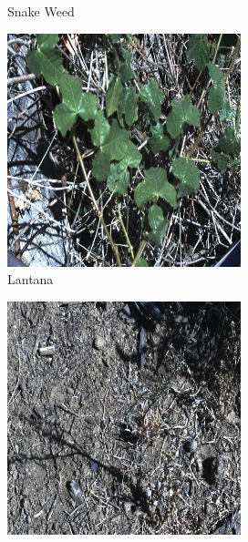 \begin{figure}[h]
\begin{subfigure}{0.24\textwidth}
        \caption{Snake Weed}
    \end{subfigure}
    \hfill
    \begin{subfigure}{0.24\textwidth}
        \includegraphics[width=\textwidth]{figuras/problema/lantana.jpg}
        \caption{Lantana}
    \end{subfigure}
    \hfill
    \begin{subfigure}{0.24\textwidth}
        \includegraphics[width=\textwidth]{figuras/problema/prickly_acacia.jpg}

\end{subfigure}
\end{figure}
